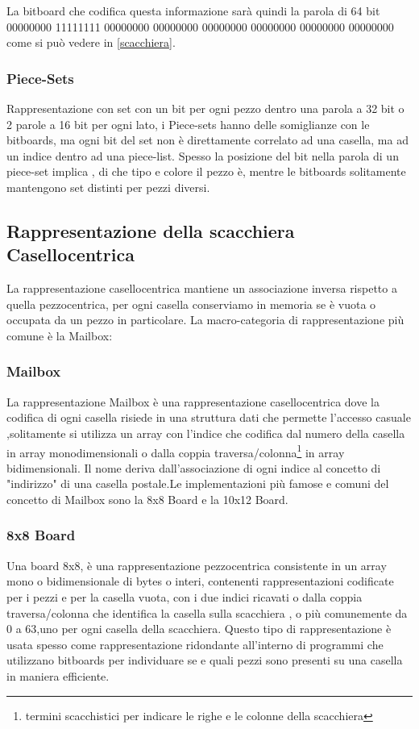 La bitboard che codifica questa informazione sarà quindi la parola di 64 bit 00000000 11111111 00000000 00000000 00000000
00000000 00000000 00000000 come si può vedere in \ref{scacchiera}.
\subsubsection{Piece-Sets}
Rappresentazione con set con un bit per ogni pezzo dentro una parola a 32 bit o 2 parole a 16 bit per ogni lato,
i Piece-sets hanno  delle somiglianze con le bitboards, ma ogni  bit del set non è   direttamente correlato ad una casella,
ma ad un indice  dentro ad una  piece-list. Spesso la posizione del bit nella parola di un  piece-set  implica
, di che tipo e colore il pezzo è, mentre le  bitboards solitamente mantengono set distinti per pezzi diversi.




\subsection{Rappresentazione della scacchiera Casellocentrica}
La rappresentazione casellocentrica  mantiene un associazione inversa rispetto a quella pezzocentrica,
per ogni casella conserviamo in memoria se è vuota o occupata da un pezzo in particolare.
La macro-categoria di  rappresentazione più comune è la Mailbox:

\subsubsection{Mailbox}
La rappresentazione Mailbox è una rappresentazione casellocentrica dove la codifica di ogni casella risiede in una struttura dati
che permette l'accesso casuale ,solitamente si utilizza un array con l'indice che codifica dal numero della casella in array monodimensionali
o dalla coppia traversa/colonna\footnote{termini scacchistici per indicare le righe e le colonne della scacchiera} in array bidimensionali.
Il nome deriva dall'associazione di ogni indice al concetto di "indirizzo" di una casella postale.Le implementazioni più famose e
comuni del concetto di Mailbox sono la 8x8 Board e la 10x12 Board.

\subsubsection{8x8 Board}
Una board 8x8, è una rappresentazione pezzocentrica consistente  in un array mono o bidimensionale di bytes o interi, contenenti rappresentazioni codificate
per i pezzi e per la casella vuota, con i due indici ricavati o dalla coppia traversa/colonna che identifica la casella sulla scacchiera ,
o più comunemente  da 0 a 63,uno per ogni casella della scacchiera.
Questo tipo di rappresentazione è usata spesso come rappresentazione ridondante all'interno di programmi che utilizzano bitboards
per individuare se e quali pezzi sono presenti su una casella in maniera efficiente.

